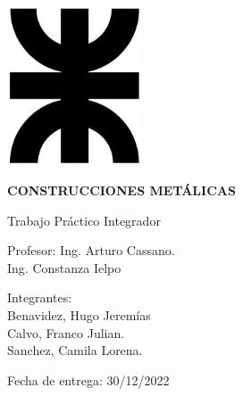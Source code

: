 \documentclass[../main.tex]{subfiles}
\begin{document}
\begin{titlepage}
\begin{center}
    \vspace{-0.5cm}   
    \includegraphics[width=0.3\textwidth]{images/logoutn.jpg}
    \vspace{0.5cm}
    
    \LARGE
    \textbf{CONSTRUCCIONES METÁLICAS}
    \vspace{2.5cm}
    
    \huge
    Trabajo Práctico Integrador
    \vspace{0.4cm}
    
    \huge
    \vspace{2.5cm}
    
   \large
    Profesor: Ing. Arturo Cassano.\\
    Ing. Constanza Ielpo \\

    \vspace{1.5cm}
    
    Integrantes:
    \\Benavidez, Hugo Jeremías
    \\Calvo, Franco Julian.
    \\Sanchez, Camila Lorena.\\
    \vspace{2cm}
    
    Fecha de entrega: 30/12/2022
\vfill
\end{center}
\end{titlepage}
\clearpage
\end{document}
